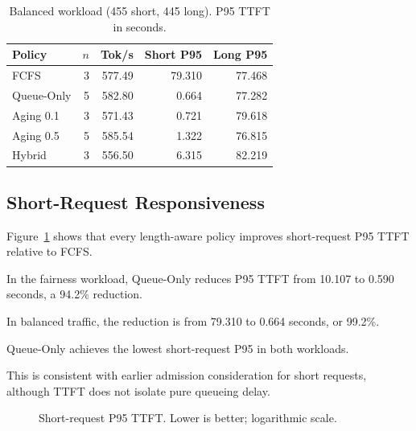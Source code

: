 \documentclass[sigplan,nonacm]{acmart}
\begin{document}
\begin{table}[t]
\centering
\caption{
Balanced workload (455 short, 445 long).
P95 TTFT in seconds.
}
\label{tab:bal}
\scriptsize
\setlength{\tabcolsep}{3pt}
\begin{tabular}{lrrrr}
\toprule
Policy & $n$ & Tok/s & Short P95 & Long P95\\
\midrule
FCFS & 3 & 577.49 & 79.310 & 77.468\\
Queue-Only & 5 & 582.80 & 0.664 & 77.282\\
Aging 0.1 & 3 & 571.43 & 0.721 & 79.618\\
Aging 0.5 & 5 & 585.54 & 1.322 & 76.815\\
Hybrid & 3 & 556.50 & 6.315 & 82.219\\
\bottomrule
\end{tabular}
\end{table}

\subsection{Short-Request Responsiveness}

Figure~\ref{fig:short} shows that every
length-aware policy improves short-request
P95 TTFT relative to FCFS.

In the fairness workload, Queue-Only reduces
P95 TTFT from 10.107 to 0.590 seconds,
a 94.2\% reduction.

In balanced traffic, the reduction is from
79.310 to 0.664 seconds, or 99.2\%.

Queue-Only achieves the lowest short-request
P95 in both workloads.

This is consistent with earlier admission
consideration for short requests, although
TTFT does not isolate pure queueing delay.

\begin{figure}[t]
\centering
{}
\caption{
Short-request P95 TTFT.
Lower is better; logarithmic scale.
}
\label{fig:short}
\end{figure}
\end{document}
